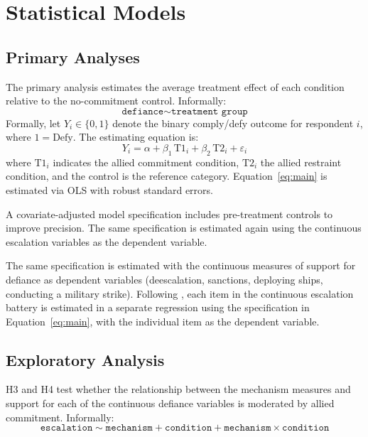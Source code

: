   \section{Statistical Models}
  \label{sec:model}

  \subsection{Primary Analyses}

  The primary analysis estimates the average treatment effect of each
  condition relative to the no-commitment control. Informally:
  \[
    \texttt{defiance} \sim \texttt{treatment group}
  \]
  Formally, let $Y_i \in \{0,1\}$ denote the binary comply/defy outcome
  for respondent $i$, where $1 = \text{Defy}$. The estimating equation is:
  \begin{equation}
    Y_i = \alpha + \beta_1\,\text{T1}_i + \beta_2\,\text{T2}_i + \varepsilon_i
    \label{eq:main}
  \end{equation}
  where $\text{T1}_i$ indicates the allied commitment condition,
  $\text{T2}_i$ the allied restraint condition, and the 
  control is the reference category. Equation~\eqref{eq:main}
  is estimated via OLS with robust standard errors. 

  A covariate-adjusted model specification includes pre-treatment controls
  to improve precision. The same specification is estimated again using the continuous escalation variables as the dependent variable.

The same specification is estimated with the continuous measures of support for defiance as dependent variables (deescalation, sanctions, deploying ships, conducting a military strike). Following \textcite{powers_psychology_2023}, each item in the continuous
escalation battery is estimated in a separate regression using the specification in Equation~\eqref{eq:main}, with the individual item as the dependent variable. 

  \subsection{Exploratory Analysis}

  H3 and H4 test whether the relationship between the mechanism measures
  and support for each of the continuous defiance variables is moderated by allied commitment. Informally:
  \[
    \texttt{escalation} \sim \texttt{mechanism} + \texttt{condition}
    + \texttt{mechanism} \times \texttt{condition}
  \]

